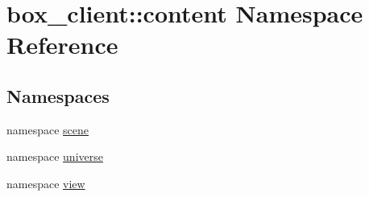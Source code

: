 \hypertarget{namespacebox__client_1_1content}{
\section{box\_\-client::content Namespace Reference}
\label{namespacebox__client_1_1content}
}
\subsection*{Namespaces}
\begin{DoxyCompactItemize}
\item 
namespace \hyperlink{namespacebox__client_1_1content_1_1scene}{scene}
\item 
namespace \hyperlink{namespacebox__client_1_1content_1_1universe}{universe}
\item 
namespace \hyperlink{namespacebox__client_1_1content_1_1view}{view}
\end{DoxyCompactItemize}
